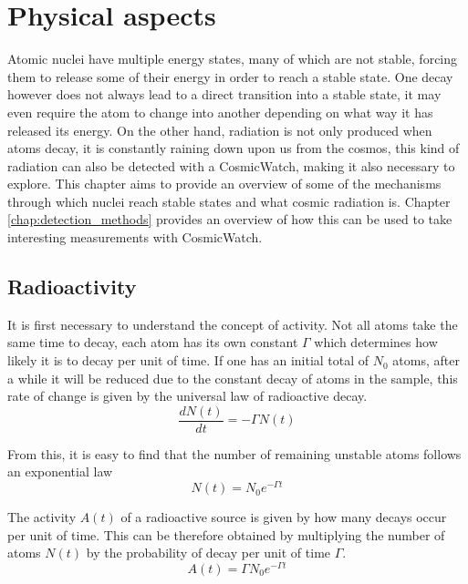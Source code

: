 \chapter{Physical aspects}

Atomic nuclei have multiple energy states, many of which are not stable, forcing them to release some of their energy in order to reach a stable state. One decay however does not always lead to a direct transition into a stable state, it may even require the atom to change into another depending on what way it has released its energy. On the other hand, radiation is not only produced when atoms decay, it is constantly raining down upon us from the cosmos, this kind of radiation can also be detected with a CosmicWatch, making it also necessary to explore. This chapter aims to provide an overview of some of the mechanisms through which nuclei reach stable states and what cosmic radiation is. Chapter \ref{chap:detection_methods} provides an overview of how this can be used to take interesting measurements with CosmicWatch.

\section{Radioactivity}

It is first necessary to understand the concept of activity. Not all atoms take the same time to decay, each atom has its own constant $\Gamma$ which determines how likely it is to decay per unit of time. If one has an initial total of $N_0$ atoms, after a while it will be reduced due to the constant decay of atoms in the sample, this rate of change is given by the universal law of radioactive decay.
\begin{equation}
    \frac{dN(t)}{dt} = -\Gamma N(t)
\end{equation}

From this, it is easy to find that the number of remaining unstable atoms follows an exponential law
\begin{equation}
    N(t) = N_0 e^{-\Gamma t}
\end{equation}

The activity $A(t)$ of a radioactive source is given by how many decays occur per unit of time. This can be therefore obtained by multiplying the number of atoms $N(t)$ by the probability of decay per unit of time $\Gamma$.
\begin{equation}
    A(t) = \Gamma N_0 e^{-\Gamma t}
\end{equation}

